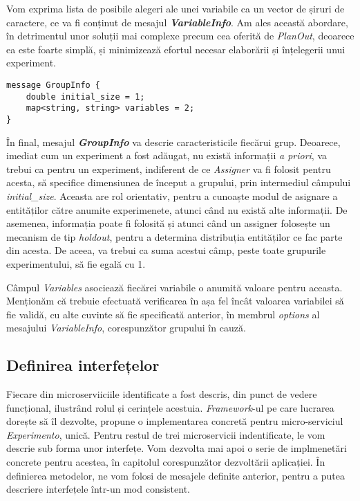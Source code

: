 Vom exprima lista de posibile alegeri ale unei variabile ca un vector de șiruri de caractere, ce va fi conținut de mesajul \textbf{\textit{VariableInfo}}. Am ales această abordare, în detrimentul unor soluții mai complexe precum cea oferită de \textit{PlanOut}, deoarece ea este foarte simplă, și minimizează efortul necesar elaborării și înțelegerii unui experiment.

\begin{center}
	\begin{lstlisting}[language=proto3]
message GroupInfo {
	double initial_size = 1;
	map<string, string> variables = 2;
}
	\end{lstlisting}
\end{center}

În final, mesajul \textbf{\textit{GroupInfo}} va descrie caracteristicile fiecărui grup. Deoarece, imediat cum un experiment a fost adăugat, nu există informații \textit{a priori}, va trebui ca pentru un experiment, indiferent de ce \textit{Assigner} va fi folosit pentru acesta, să specifice dimensiunea de început a grupului, prin intermediul câmpului \textit{initial\_size}. Aceasta are rol orientativ, pentru a cunoaște modul de asignare a entităților către anumite experimenete, atunci când nu există alte informații. De asemenea, informația poate fi folosită și atunci când un assigner folosește un mecanism de tip \textit{holdout}, pentru a determina distribuția entităților ce fac parte din acesta. De aceea, va trebui ca suma acestui câmp, peste toate grupurile experimentului, să fie egală cu 1.

Câmpul \textit{Variables} asociează fiecărei variabile o anumită valoare pentru aceasta. Menționăm că trebuie efectuată verificarea în așa fel încât valoarea variabilei să fie validă, cu alte cuvinte să fie specificată anterior, în membrul \textit{options} al mesajului \textit{VariableInfo}, corespunzător grupului în cauză.

\subsection{Definirea interfețelor}

Fiecare din microserviiciile identificate a fost descris, din punct de vedere funcțional, ilustrând rolul și cerințele acestuia. \textit{Framework}-ul pe care lucrarea dorește să îl dezvolte, propune o implementarea concretă pentru micro-serviciul \textit{Experimento}, unică. Pentru restul de trei microservicii indentificate, le vom descrie sub forma unor interfețe. Vom dezvolta mai apoi o serie de implmenetări concrete pentru acestea, în capitolul corespunzător dezvoltării aplicației. În definierea metodelor, ne vom folosi de mesajele definite anterior, pentru a putea descriere interfețele într-un mod consistent.

